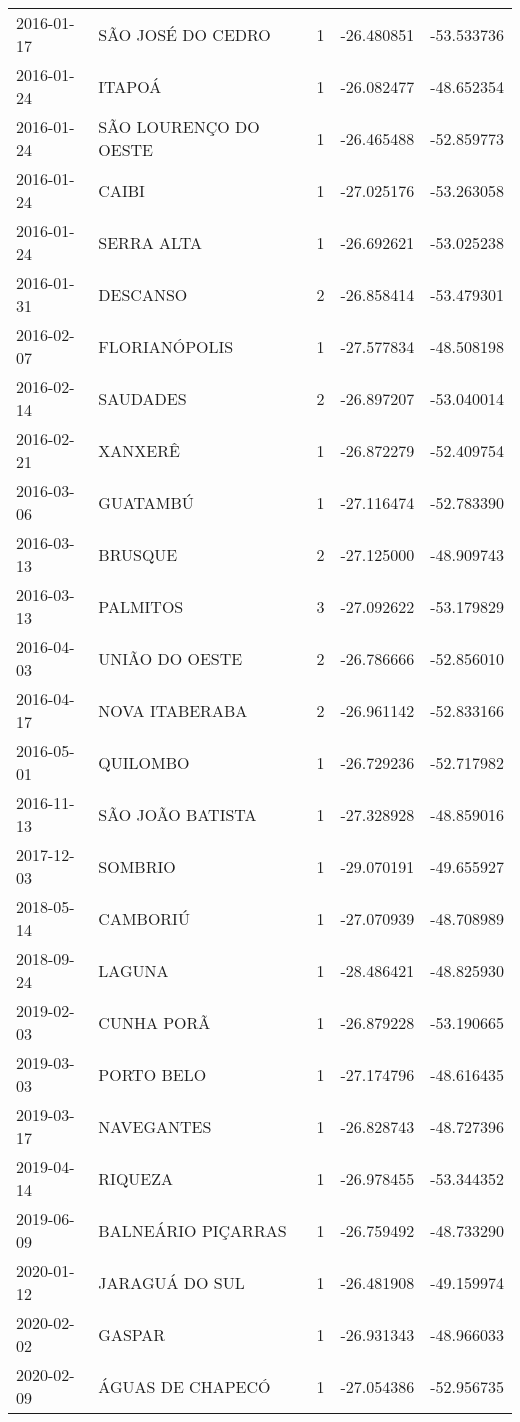 \documentclass[
	12pt,				%
	openright,			%
	oneside,			%
	a4paper,			%
	english,			%
	french,				%
	spanish,			%
	brazil				%
	dvipsnames, table]{abntex2}
\begin{document}
\begin{longtable}[htbp]{llcrr}
2016-01-17 & SÃO JOSÉ DO CEDRO & 1 & -26.480851 & -53.533736 \\
2016-01-24 & ITAPOÁ & 1 & -26.082477 & -48.652354 \\
2016-01-24 & SÃO LOURENÇO DO OESTE & 1 & -26.465488 & -52.859773 \\
2016-01-24 & CAIBI & 1 & -27.025176 & -53.263058 \\
2016-01-24 & SERRA ALTA & 1 & -26.692621 & -53.025238 \\
2016-01-31 & DESCANSO & 2 & -26.858414 & -53.479301 \\
2016-02-07 & FLORIANÓPOLIS & 1 & -27.577834 & -48.508198 \\
2016-02-14 & SAUDADES & 2 & -26.897207 & -53.040014 \\
2016-02-21 & XANXERÊ & 1 & -26.872279 & -52.409754 \\
2016-03-06 & GUATAMBÚ & 1 & -27.116474 & -52.783390 \\
2016-03-13 & BRUSQUE & 2 & -27.125000 & -48.909743 \\
2016-03-13 & PALMITOS & 3 & -27.092622 & -53.179829 \\
2016-04-03 & UNIÃO DO OESTE & 2 & -26.786666 & -52.856010 \\
2016-04-17 & NOVA ITABERABA & 2 & -26.961142 & -52.833166 \\
2016-05-01 & QUILOMBO & 1 & -26.729236 & -52.717982 \\
2016-11-13 & SÃO JOÃO BATISTA & 1 & -27.328928 & -48.859016 \\
2017-12-03 & SOMBRIO & 1 & -29.070191 & -49.655927 \\
2018-05-14 & CAMBORIÚ & 1 & -27.070939 & -48.708989 \\
2018-09-24 & LAGUNA & 1 & -28.486421 & -48.825930 \\
2019-02-03 & CUNHA PORÃ & 1 & -26.879228 & -53.190665 \\
2019-03-03 & PORTO BELO & 1 & -27.174796 & -48.616435 \\
2019-03-17 & NAVEGANTES & 1 & -26.828743 & -48.727396 \\
2019-04-14 & RIQUEZA & 1 & -26.978455 & -53.344352 \\
2019-06-09 & BALNEÁRIO PIÇARRAS & 1 & -26.759492 & -48.733290 \\
2020-01-12 & JARAGUÁ DO SUL & 1 & -26.481908 & -49.159974 \\
2020-02-02 & GASPAR & 1 & -26.931343 & -48.966033 \\
2020-02-09 & ÁGUAS DE CHAPECÓ & 1 & -27.054386 & -52.956735 \\

\end{longtable}
\end{document}
